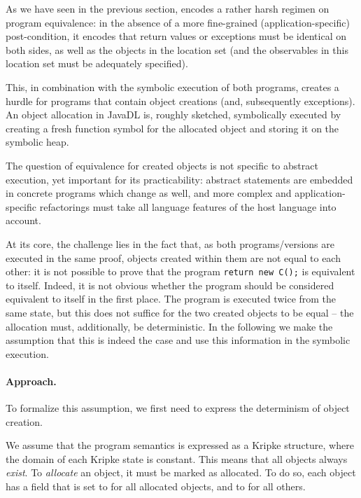 
As we have seen in the previous section, \Refinity{} encodes a rather harsh regimen on program equivalence:
in the absence of a more fine-grained (application-specific) post-condition, it encodes that return values or exceptions must be identical on both sides,
as well as the objects in the \relevant{} location set (and the observables in this location set must be adequately specified).

This, in combination with the symbolic execution of both programs, creates a hurdle for programs that contain object creations (and, subsequently exceptions).
An object allocation in JavaDL is, roughly sketched, symbolically executed by creating a fresh function symbol for the allocated object and storing it on the symbolic heap.

The question of equivalence for created objects is not specific to abstract execution, yet important for its practicability: 
abstract statements are embedded in concrete programs which change  as well, and more complex and application-specific refactorings must take all language features of the
host language into account.


At its core, the challenge lies in the fact that, as both programs/versions are executed in the same proof, objects created within them are not equal to each other: it is not possible to prove that the program \lstinline[style=refinity]|return new C();| is equivalent to itself.
Indeed, it is not obvious whether the program should be considered equivalent to itself in the first place.
The program is executed twice from the same state, but this does not suffice for the two created objects to be equal -- the allocation must, additionally, be deterministic.
In the following we make the assumption that this is indeed the case and use this information in the symbolic execution.


\paragraph{Approach.}
To formalize this assumption, we first need to express the determinism of object creation.

We assume that the program semantics is expressed as a Kripke structure, where the domain of each Kripke state is constant.
This means that all objects always \emph{exist}. To \emph{allocate} an object, it must be marked as allocated.
To do so, each object has a field  that is set to  for all allocated objects, and to  for all others.

